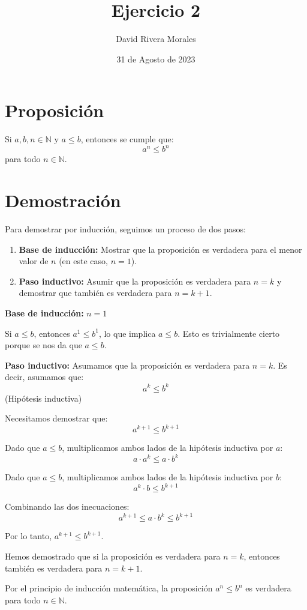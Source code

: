 \documentclass{article}
\begin{document}
\title{Ejercicio 2}
\author{David Rivera Morales}
\date{31 de Agosto de 2023}
\maketitle

\section*{Proposición}
Si \(a, b, n \in \mathbb{N}\) y \(a \leq b\), entonces se cumple que:
\[a^n \leq b^n\]
para todo \(n \in \mathbb{N}\).

\section*{Demostración}

Para demostrar por inducción, seguimos un proceso de dos pasos:

\begin{enumerate}
    \item \textbf{Base de inducción:} Mostrar que la proposición es verdadera para el menor valor de \(n\) (en este caso, \(n = 1\)).
    \item \textbf{Paso inductivo:} Asumir que la proposición es verdadera para \(n = k\) y demostrar que también es verdadera para \(n = k + 1\).
\end{enumerate}

\noindent \textbf{Base de inducción:} \(n = 1\)

Si \(a \leq b\), entonces \(a^1 \leq b^1\), lo que implica \(a \leq b\). Esto es trivialmente cierto porque se nos da que \(a \leq b\).

\noindent \textbf{Paso inductivo:} Asumamos que la proposición es verdadera para \(n = k\). Es decir, asumamos que:
\[a^k \leq b^k\] (Hipótesis inductiva)

Necesitamos demostrar que:
\[a^{k+1} \leq b^{k+1}\]

Dado que \(a \leq b\), multiplicamos ambos lados de la hipótesis inductiva por \(a\):
\[a \cdot a^k \leq a \cdot b^k\]

Dado que \(a \leq b\), multiplicamos ambos lados de la hipótesis inductiva por \(b\):
\[a^k \cdot b \leq b^{k+1}\]

Combinando las dos inecuaciones:
\[a^{k+1} \leq a \cdot b^k \leq b^{k+1}\]

Por lo tanto, \(a^{k+1} \leq b^{k+1}\).

Hemos demostrado que si la proposición es verdadera para \(n = k\), entonces también es verdadera para \(n = k + 1\).

Por el principio de inducción matemática, la proposición \(a^n \leq b^n\) es verdadera para todo \(n \in \mathbb{N}\).
\end{document}
